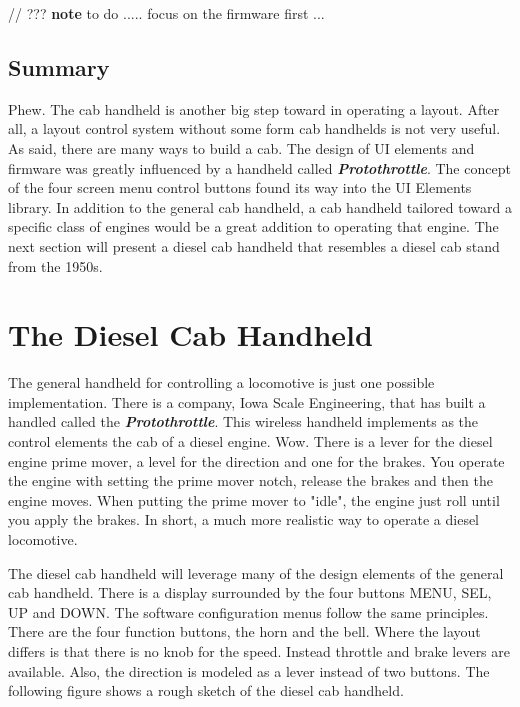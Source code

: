 // ??? \textbf{note} to do ..... focus on the firmware first ...


\subsection{Summary}

Phew. The cab handheld is another big step toward in operating a layout. After all, a layout control system without some form cab handhelds is not very useful. As said, there are many ways to build a cab. The design of UI elements and firmware was greatly influenced by a handheld called \textbf{\textit{Protothrottle}}. The concept of the four screen menu control buttons found its way into the UI Elements library. In addition to the general cab handheld, a cab handheld tailored toward a specific class of engines would be a great addition to operating that engine. The next section will present a diesel cab handheld that resembles a diesel cab stand from the 1950s.

\section{The Diesel Cab Handheld}

The general handheld for controlling a locomotive is just one possible implementation. There is a company, Iowa Scale Engineering, that has built a handled called the \textbf{\textit{Protothrottle}}. This wireless handheld implements as the control elements the cab of a diesel engine. Wow. There is a lever for the diesel engine prime mover, a level for the direction and one for the brakes. You operate the engine with setting the prime mover notch, release the brakes and then the engine moves. When putting the prime mover to "idle", the engine just roll until you apply the brakes. In short, a much more realistic way to operate a diesel locomotive. 

The diesel cab handheld will leverage many of the design elements of the general cab handheld. There is a display surrounded by the four buttons MENU, SEL, UP and DOWN. The software configuration menus follow the same principles. There are the four function buttons, the horn and the bell. Where the layout differs is that there is no knob for the speed. Instead throttle and brake levers are available. Also, the direction is modeled as a lever instead of two buttons. The following figure shows a rough sketch of the diesel cab handheld.

